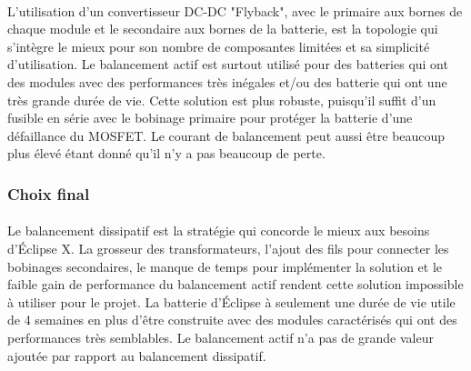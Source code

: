 \paragraph*{}
L'utilisation d'un convertisseur DC-DC "Flyback", avec le primaire aux bornes de chaque module et le secondaire aux bornes de la batterie, est la topologie qui s'intègre le mieux pour son nombre de composantes limitées et sa simplicité d'utilisation. Le balancement actif est surtout utilisé pour des batteries qui ont des modules avec des performances très inégales et/ou des batterie qui ont une très grande durée de vie. Cette solution est plus robuste, puisqu'il suffit d'un fusible en série avec le bobinage primaire pour protéger la batterie d'une défaillance du MOSFET. Le courant de balancement peut aussi être beaucoup plus élevé étant donné qu'il n'y a pas beaucoup de perte.

\subsubsection*{Choix final}
\paragraph*{}
Le balancement dissipatif est la stratégie qui concorde le mieux aux besoins d'Éclipse X. La grosseur des transformateurs, l'ajout des fils pour connecter les bobinages secondaires, le manque de temps pour implémenter la solution et le faible gain de performance du balancement actif rendent cette solution impossible à utiliser pour le projet. La batterie d'Éclipse à seulement une durée de vie utile de 4 semaines en plus d'être construite avec des modules caractérisés qui ont des performances très semblables. Le balancement actif n'a pas de grande valeur ajoutée par rapport au balancement dissipatif.




